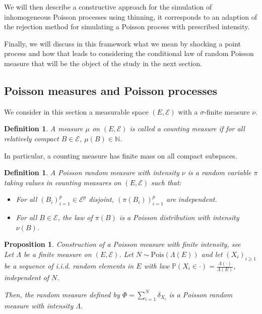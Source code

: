 \documentclass{article} %
\newtheorem{definition}[theorem]{Definition}
\newtheorem{proposition}[theorem]{Proposition}
\newcommand{\1}{\mathbbm{1}} %
\begin{document}
We will then describe a constructive approach for the simulation of inhomogeneous Poisson processes using thinning, it corresponds to an adaption of the rejection method for simulating a Poisson process with prescribed intensity.

Finally, we will discuss in this framework what we mean by shocking a point process and how that leads to considering the conditional law of random Poisson measure that will be the object of the study in the next section.

\subsection{Poisson measures and Poisson processes}

We consider in this section a measurable space $(E, \mathcal{E})$ with a $\sigma$-finite measure $\nu$.

\begin{definition}
    A measure $\mu$ on $(E,\mathcal{E})$ is called a counting measure if for all relatively compact $B \in \mathcal{E}$, $\mu(B) \in \mathbb{N}$.
\end{definition}

In particular, a counting measure has finite mass on all compact subspaces.

\begin{definition}
    A Poisson random measure with intensity $\nu$ is a random variable $\pi$ taking values in counting measures on $(E,\mathcal{E})$ such that:
    \begin{itemize}
        \item For all $(B_i)_{i=1}^p \in \mathcal{E}^p$ disjoint, $(\pi(B_i))_{i=1}^p$ are independent.
        \item For all $B \in \mathcal{E}$, the law of $\pi(B)$ is a Poisson distribution with intensity $\nu(B)$.
    \end{itemize}
\end{definition}

\begin{proposition}\textit{Construction of a Poisson measure with finite intensity}, see \cite[Prop. 2.1.6.]{RPG}
    \leavevmode \\
    Let $\Lambda$ be a finite measure on $(E, \mathcal{E})$. Let $N \sim \text{Pois}(\Lambda(E))$ and let $(X_i)_{i \ge 1}$ be a sequence of i.i.d. random elements in $E$ with law $\mathbb{P}(X_i \in \cdot) = \frac{\Lambda(\cdot)}{\Lambda(E)}$, independent of $N$.
    
    Then, the random measure defined by $\Phi = \sum_{i=1}^N \delta_{X_i}$
    is a Poisson random measure with intensity $\Lambda$.
\end{proposition}
\end{document}
